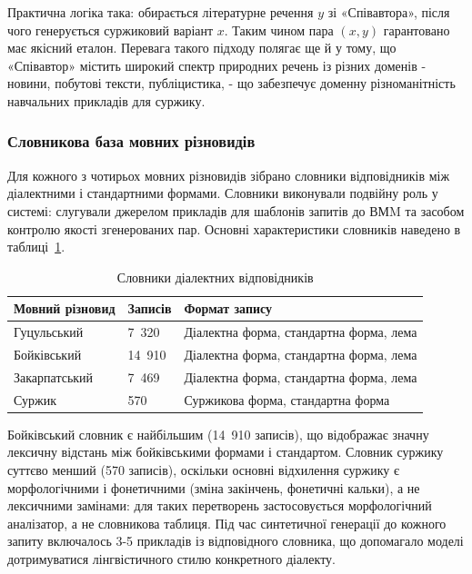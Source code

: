 \documentclass[14pt]{extarticle}
\begin{document}
Практична логіка така: обирається літературне речення $y$ зі «Співавтора», після чого генерується суржиковий варіант $x$. Таким чином пара $(x, y)$ гарантовано має якісний еталон. Перевага такого підходу полягає ще й у тому, що «Співавтор» містить широкий спектр природних речень із різних доменів - новини, побутові тексти, публіцистика, - що забезпечує доменну різноманітність навчальних прикладів для суржику.

\subsubsection{Словникова база мовних різновидів}

Для кожного з чотирьох мовних різновидів зібрано словники відповідників між діалектними і стандартними формами. Словники виконували подвійну роль у системі: слугували джерелом прикладів для шаблонів запитів до ВМM та засобом контролю якості згенерованих пар. Основні характеристики словників наведено в таблиці~\ref{tab:dicts}.

\begin{table}[ht]
\caption{Словники діалектних відповідників}
\label{tab:dicts}
\setlength{\tabcolsep}{4pt}
\begin{tabular}{|p{}|p{}|p{}|}
\hline
\textbf{Мовний різновид} & \textbf{Записів} & \textbf{Формат запису} \\
\hline
Гуцульський & 7~320 & Діалектна форма, стандартна форма, лема \\
\hline
Бойківський & 14~910 & Діалектна форма, стандартна форма, лема \\
\hline
Закарпатський & 7~469 & Діалектна форма, стандартна форма, лема \\
\hline
Суржик & 570 & Суржикова форма, стандартна форма \\
\hline
\end{tabular}
\end{table}

Бойківський словник є найбільшим (14~910 записів), що відображає значну лексичну відстань між бойківськими формами і стандартом. Словник суржику суттєво менший (570 записів), оскільки основні відхилення суржику є морфологічними і фонетичними (зміна закінчень, фонетичні кальки), а не лексичними замінами: для таких перетворень застосовується морфологічний аналізатор, а не словникова таблиця. Під час синтетичної генерації до кожного запиту включалось 3-5 прикладів із відповідного словника, що допомагало моделі дотримуватися лінгвістичного стилю конкретного діалекту.
\end{document}
